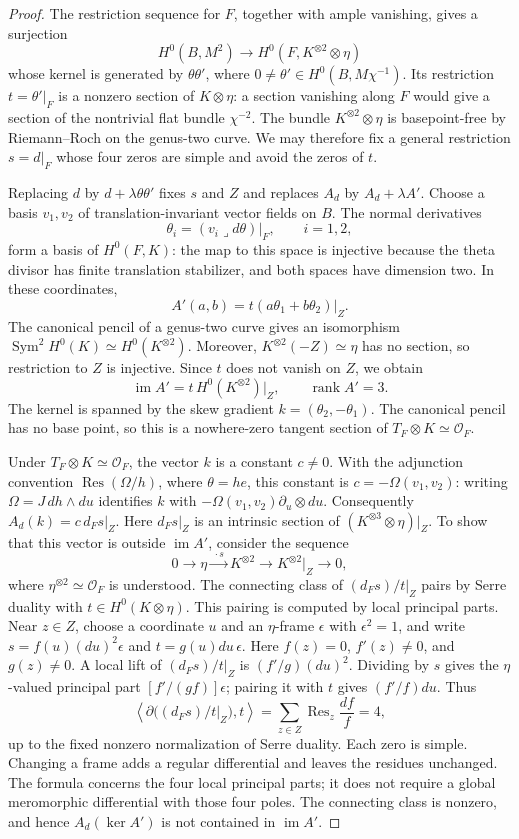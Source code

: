 \documentclass[11pt]{amsart}
\DeclareMathOperator{\rank}{rank}
\DeclareMathOperator{\im}{im}
\DeclareMathOperator{\Sym}{Sym}
\theoremstyle{definition}
\theoremstyle{remark}
\numberwithin{equation}{section}
\begin{document}
\begin{proof}
The restriction sequence for $F$, together with ample vanishing, gives
a surjection
\[
 H^0(B,M^2)\longrightarrow H^0(F,K^{\otimes2}\otimes\eta)
\]
whose kernel is generated by $\theta\theta'$, where
$0\ne\theta'\in H^0(B,M\chi^{-1})$.  Its restriction
$t=\theta'|_F$ is a nonzero section of $K\otimes\eta$:
a section vanishing along $F$ would give a section of the nontrivial
flat bundle $\chi^{-2}$.  The bundle $K^{\otimes2}\otimes\eta$
is basepoint-free by Riemann--Roch on the genus-two curve.  We may
therefore fix a general restriction $s=d|_F$ whose four zeros are
simple and avoid the zeros of $t$.

Replacing $d$ by $d+\lambda\theta\theta'$ fixes $s$ and $Z$ and
replaces $A_d$ by $A_d+\lambda A'$.  Choose a basis $v_1,v_2$ of
translation-invariant vector fields on $B$.  The normal derivatives
\[
 \theta_i=(v_i\mathbin{\lrcorner}d\theta)|_F,\qquad i=1,2,
\]
form a basis of $H^0(F,K)$: the map to this space is injective
because the theta divisor has finite translation stabilizer, and
both spaces have dimension two.  In these coordinates,
\[
 A'(a,b)=t(a\theta_1+b\theta_2)|_Z.
\]
The canonical pencil of a genus-two curve gives an isomorphism
$\Sym^2H^0(K)\simeq H^0(K^{\otimes2})$.  Moreover,
$K^{\otimes2}(-Z)\simeq\eta$ has no section, so restriction to $Z$
is injective.  Since $t$ does not vanish on $Z$, we obtain
\[
 \im A'=t\,H^0(K^{\otimes2})|_Z,\qquad \rank A'=3.
\]
The kernel is spanned by the skew gradient
$k=(\theta_2,-\theta_1)$.  The canonical pencil has no base point,
so this is a nowhere-zero tangent section of
$T_F\otimes K\simeq\mathcal O_F$.

Under $T_F\otimes K\simeq\mathcal O_F$, the vector $k$ is a
constant $c\ne0$.  With the adjunction convention
$\operatorname{Res}(\Omega/h)$, where $\theta=h e$, this constant is
$c=-\Omega(v_1,v_2)$: writing $\Omega=J\,dh\wedge du$ identifies
$k$ with $-\Omega(v_1,v_2)\partial_u\otimes du$.
Consequently $A_d(k)=c\,d_Fs|_Z$.  Here $d_Fs|_Z$ is an intrinsic section of
$(K^{\otimes3}\otimes\eta)|_Z$.  To show that this vector is outside
$\im A'$, consider the sequence
\[
 0\longrightarrow\eta\xrightarrow{\ \cdot s\ }K^{\otimes2}
       \longrightarrow K^{\otimes2}|_Z\longrightarrow0,
\]
where $\eta^{\otimes2}\simeq\mathcal O_F$ is understood.  The
connecting class of $(d_Fs)/t|_Z$ pairs by Serre duality with
$t\in H^0(K\otimes\eta)$.  This pairing is computed by local
principal parts.  Near $z\in Z$, choose a coordinate $u$ and
an $\eta$-frame $\epsilon$ with $\epsilon^2=1$, and write
$s=f(u)(du)^2\epsilon$ and $t=g(u)du\,\epsilon$.
Here $f(z)=0$, $f'(z)\ne0$, and $g(z)\ne0$.  A local lift of
$(d_Fs)/t|_Z$ is $(f'/g)(du)^2$.  Dividing by $s$ gives the
$\eta$-valued principal part $[f'/(gf)]\epsilon$; pairing it with
$t$ gives $(f'/f)du$.  Thus
\[
 \left\langle\partial\bigl((d_Fs)/t|_Z\bigr),t\right\rangle
   =\sum_{z\in Z}\operatorname{Res}_z\frac{df}{f}=4,
\]
up to the fixed nonzero normalization of Serre duality.  Each zero
is simple.  Changing a frame adds a regular differential and leaves
the residues unchanged.  The formula concerns the four local
principal parts; it does not require a global meromorphic
differential with those four poles.  The connecting class is
nonzero, and hence $A_d(\ker A')$ is not contained in $\im A'$.


\end{proof}
\end{document}
